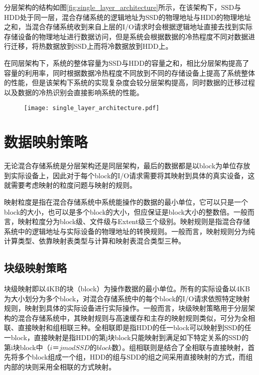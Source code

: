 分层架构的结构如图\ref{fig:single_layer_architecture}所示，在该架构下，SSD与HDD处于同一层，混合存储系统的逻辑地址为SSD的物理地址与HDD的物理地址之和，当混合存储系统收到来自上层的I/O请求时会根据逻辑地址直接去找到实际存储设备的物理地址进行数据访问，但是系统会根据数据的冷热程度不同对数据进行迁移，将热数据放到SSD上而将冷数据放到HDD上。

在同层架构下，系统的整体容量为SSD与HDD的容量之和，相比分层架构提高了容量的利用率，同时根据数据冷热程度不同放到不同的存储设备上提高了系统整体的性能，但是该架构下系统的实现复杂度会较分层架构提高，同时数据的迁移过程以及数据的冷热识别会直接影响系统的性能。

\begin{figure}[!htp]
    \centering
    \texttt{[image: single\_layer\_architecture.pdf]}
\end{figure}

\section{数据映射策略}

无论混合存储系统是分层架构还是同层架构，最后的数据都是以block为单位存放到实际设备上，因此对于每个block的I/O请求需要将其映射到具体的真实设备，这就需要考虑映射的粒度问题与映射的规则。

映射粒度是指在混合存储系统中系统能操作的数据的最小单位，它可以只是一个block的大小，也可以是多个block的大小，但应保证是block大小的整数倍。一般而言，映射粒度分为block级、文件级与Extent级三个级别。映射规则是指混合存储系统中的逻辑地址与实际设备的物理地址的转换规则。一般而言，映射规则分为纯计算类型、依靠映射表类型与计算和映射表混合类型三种。

\subsection{块级映射策略}

块级映射即以4KB的块（block）为操作数据的最小单位。所有的实际设备以4KB为大小划分为多个block，对混合存储系统中的每个block的I/O请求依照特定映射规则，映射到具体的实际设备进行实际操作。一般而言，块级映射策略用于分层架构的混合存储系统中，其映射规则与高速缓存和主存的映射规则类似，可分为全相联、直接映射和组相联三种。全相联即是指HDD的任一block可以映射到SSD的任一block，直接映射是指HDD的第j块block只能映射到满足如下特定关系的SSD的第i块block中（$i＝j mod SSD的block数$）。组相联则是结合了全相联与直接映射，首先将多个block组成一个组，HDD的组与SDD的组之间采用直接映射的方式，而组内部的块则采用全相联的方式映射。

